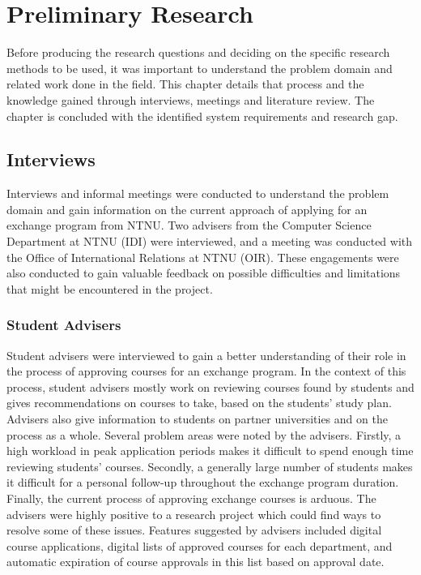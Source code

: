 \chapter{Preliminary Research} \label{chap:2}

Before producing the research questions and deciding on the specific research methods to be used, it was important to understand the problem domain and related work done in the field. This chapter details that process and the knowledge gained through interviews, meetings and literature review. The chapter is concluded with the identified system requirements and research gap.

\section{Interviews}

Interviews and informal meetings were conducted to understand the problem domain and gain information on the current approach of applying for an exchange program from NTNU. Two advisers from the Computer Science Department at NTNU (IDI) were interviewed, and a meeting was conducted with the Office of International Relations at NTNU (OIR). These engagements were also conducted to gain valuable feedback on possible difficulties and limitations that might be encountered in the project.

\subsection{Student Advisers} 

Student advisers were interviewed to gain a better understanding of their role in the process of approving courses for an exchange program. In the context of this process, student advisers mostly work on reviewing courses found by students and gives recommendations on courses to take, based on the students' study plan. Advisers also give information to students on partner universities and on the process as a whole. Several problem areas were noted by the advisers. Firstly, a high workload in peak application periods makes it difficult to spend enough time reviewing students' courses. Secondly, a generally large number of students makes it difficult for a personal follow-up throughout the exchange program duration. Finally, the current process of approving exchange courses is arduous. The advisers were highly positive to a research project which could find ways to resolve some of these issues. Features suggested by advisers included digital course applications, digital lists of approved courses for each department, and automatic expiration of course approvals in this list based on approval date.

